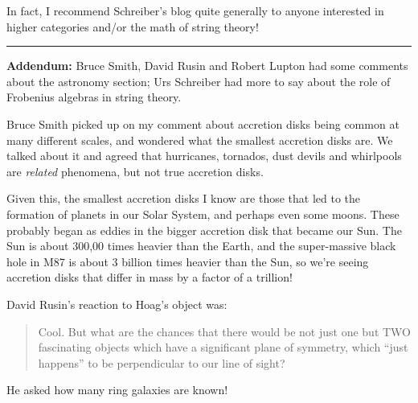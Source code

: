 \documentclass{article}
\begin{document}
In fact, I recommend Schreiber's blog quite generally to anyone
interested in higher categories and/or the math of string theory!

\begin{center}\rule{0.5\linewidth}{0.5pt}\end{center}

\textbf{Addendum:} Bruce Smith, David Rusin and Robert Lupton had some
comments about the astronomy section; Urs Schreiber had more to say
about the role of Frobenius algebras in string theory.

Bruce Smith picked up on my comment about accretion disks being common
at many different scales, and wondered what the smallest accretion disks
are. We talked about it and agreed that hurricanes, tornados, dust
devils and whirlpools are \emph{related} phenomena, but not true
accretion disks.

Given this, the smallest accretion disks I know are those that led to
the formation of planets in our Solar System, and perhaps even some
moons. These probably began as eddies in the bigger accretion disk that
became our Sun. The Sun is about 300,00 times heavier than the Earth,
and the super-massive black hole in M87 is about 3 billion times heavier
than the Sun, so we're seeing accretion disks that differ in mass by a
factor of a trillion!

David Rusin's reaction to Hoag's object was:

\begin{quote}
Cool. But what are the chances that there would be not just one but TWO
fascinating objects which have a significant plane of symmetry, which
``just happens'' to be perpendicular to our line of sight?
\end{quote}

He asked how many ring galaxies are known!
\end{document}
